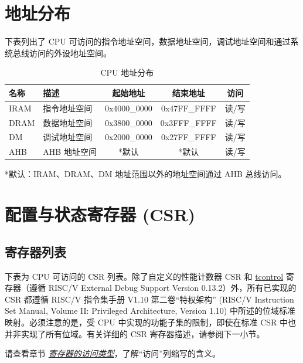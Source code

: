 \documentclass[main\_\_CN.tex]{subfiles}
\begin{document}
\section{地址分布}
下表列出了 CPU 可访问的指令地址空间，数据地址空间，调试地址空间和通过系统总线访问的外设地址空间。

\begin{longtable}{| l| l |c | c | c  |}
\caption{CPU 地址分布} \label{tab:riscvcpu-mem-blocks}
\\ \hline
\rowcolor{lightgray}
名称 & 描述   &  起始地址  &  结束地址  & 访问  \\ \hline
IRAM\label{TBD1} & 指令地址空间  &   0x4000\_0000  &  0x47FF\_FFFF  &  读/写 \\ \hline
DRAM\label{TBD2} & 数据地址空间 &     0x3800\_0000  &  0x3FFF\_FFFF  &  读/写 \\ \hline
DM \label{TBD4} & 调试地址空间  &      0x2000\_0000  &  0x27FF\_FFFF  &  读/写 \\ \hline
AHB\label{TBD3} & AHB 地址空间 &      *默认  &  *默认  &  读/写 \\ \hline
\end{longtable}

*默认：IRAM、DRAM、DM 地址范围以外的地址空间通过 AHB 总线访问。



\section{配置与状态寄存器 (CSR)}
\hypertarget{riscvcpu-cpu-reg-summ}{}
\subsection{寄存器列表}
\label{sec:riscvcpu-cpu-reg-summ}


下表为 CPU 可访问的 CSR 列表。除了自定义的性能计数器 CSR 和 \hyperref[regdesc:TCONTROL]{tcontrol} 寄存器（遵循 RISC\-/V External Debug Support Version 0.13.2）外，所有已实现的 CSR 都遵循 RISC\-/V 指令集手册 V1.10 第二卷“特权架构” (RISC\-/V Instruction Set Manual, Volume II: Privileged Architecture, Version 1.10) 中所述的位域标准映射。必须注意的是，受 CPU 中实现的功能子集的限制，即使在标准 CSR 中也并非实现了所有位域。有关详细的 CSR 寄存器描述，请参阅下一小节。

请查看章节 \hyperref[glossary-access-types]{\textit{寄存器的访问类型}}，了解“访问”列缩写的含义。


\end{document}
